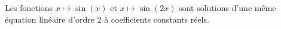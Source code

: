 Les fonctions $x\mapsto \sin(x)$ et $x\mapsto \sin(2x)$ sont solutions d'une même équation linéaire d'ordre $2$ à coefficients constants réels.

\begin{reponses}
\end{reponses}

